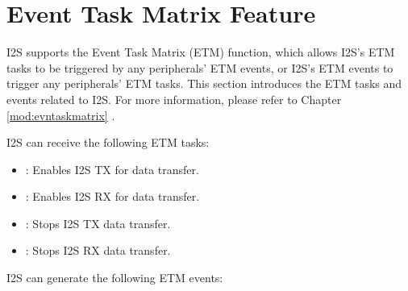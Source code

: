 \documentclass[main\_\_EN.tex]{subfiles}
\begin{document}
\section{Event Task Matrix Feature}\label{sec:i2s-etm-func}

\chipname{} I2S supports the Event Task Matrix (ETM) function, which allows I2S's ETM tasks to be triggered by any peripherals' ETM events, or I2S's ETM events to trigger any peripherals' ETM tasks. This section introduces the ETM tasks and events related to I2S. For more information, please refer to Chapter \ref{mod:evntaskmatrix} .

I2S can receive the following ETM tasks:

\begin{itemize}
    \item \label{task:I2STASKSTARTTX}: Enables I2S TX for data transfer.
    \item \label{task:I2STASKSTARTRX}: Enables I2S RX for data transfer.
    \item \label{task:I2STASKSTOPTX}: Stops I2S TX data transfer.
    \item \label{task:I2STASKSTOPRX}: Stops I2S RX data transfer.
\end{itemize}

I2S can generate the following ETM events:
\end{document}
